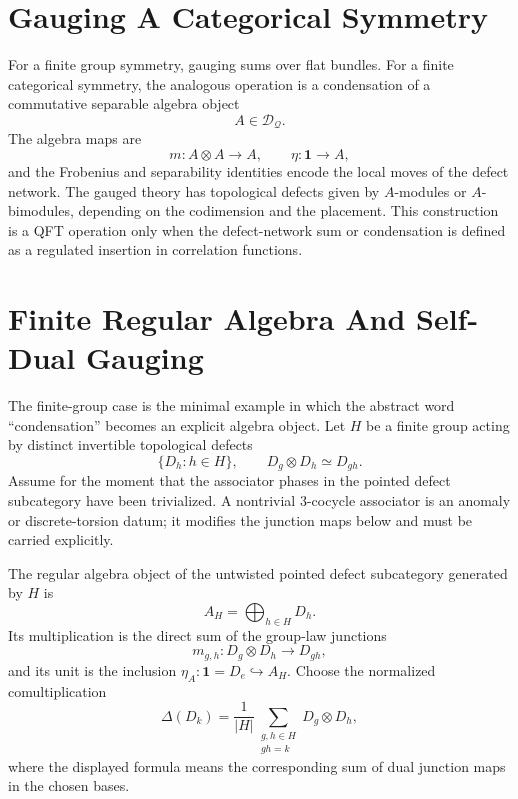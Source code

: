 \section{Gauging A Categorical Symmetry}

For a finite group symmetry, gauging sums over flat bundles.  For a finite
categorical symmetry, the analogous operation is a condensation of a
commutative separable algebra object
\[
  A\in\mathcal D_{\mathcal Q}.
\]
The algebra maps are
\[
  m:A\otimes A\to A,\qquad
  \eta:\mathbf 1\to A,
\]
and the Frobenius and separability identities encode the local moves of the
defect network.  The gauged theory has topological defects given by
\(A\)-modules or \(A\)-bimodules, depending on the codimension and the
placement.  This construction is a QFT operation only when the defect-network
sum or condensation is defined as a regulated insertion in correlation
functions.

\section{Finite Regular Algebra And Self-Dual Gauging}

The finite-group case is the minimal example in which the abstract word
``condensation'' becomes an explicit algebra object.  Let \(H\) be a finite
group acting by distinct invertible topological defects
\[
  \{D_h:h\in H\},\qquad D_g\otimes D_h\simeq D_{gh}.
\]
Assume for the moment that the associator phases in the pointed defect
subcategory have been trivialized.  A nontrivial \(3\)-cocycle associator is
an anomaly or discrete-torsion datum; it modifies the junction maps below and
must be carried explicitly.

\begin{definition}
\label{def:categorical-regular-algebra-finite-symmetry}
The regular algebra object of the untwisted pointed defect subcategory
generated by \(H\) is
\[
  A_H=\bigoplus_{h\in H}D_h .
\]
Its multiplication is the direct sum of the group-law junctions
\[
  m_{g,h}:D_g\otimes D_h\longrightarrow D_{gh},
\]
and its unit is the inclusion \(\eta_A:\mathbf 1=D_e\hookrightarrow A_H\).
Choose the normalized comultiplication
\begin{equation}
  \Delta(D_k)=
  \frac1{|H|}
  \sum_{\substack{g,h\in H\\ gh=k}}
  D_g\otimes D_h ,
  \label{eq:regular-algebra-normalized-comultiplication}
\end{equation}
where the displayed formula means the corresponding sum of dual junction
maps in the chosen bases.
\end{definition}

